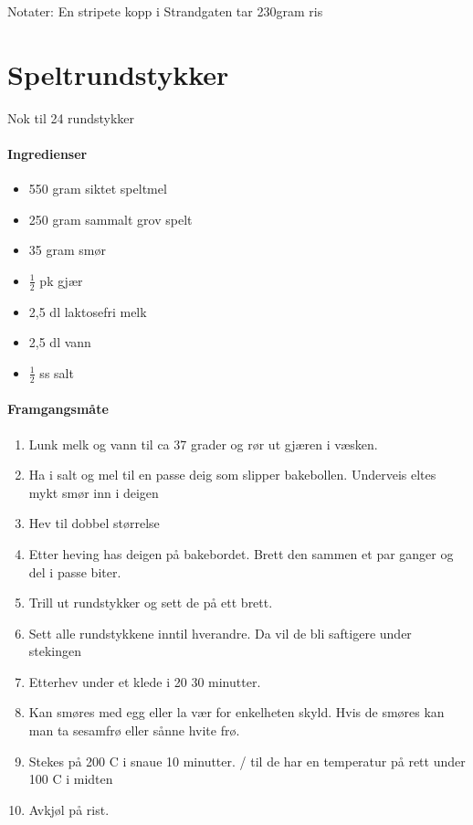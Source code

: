 \documentclass[12pt,a4paper]{book}
\begin{document}
{Notater: En stripete kopp i Strandgaten tar 230gram ris
\clearpage{}
\clearpage{}\section{Speltrundstykker}
Nok til 24 rundstykker

\paragraph{Ingredienser}
\begin{itemize}[noitemsep]
	\item 550 gram siktet speltmel
	\item 250 gram sammalt grov spelt
	\item 35 gram smør
	\item  $\frac{1}{2}$  pk gjær
	\item 2,5 dl laktosefri melk
	\item 2,5 dl vann
	\item  $\frac{1}{2}$  ss salt
\end{itemize}


\paragraph{Framgangsmåte}
\begin{enumerate}[noitemsep]
	\item Lunk melk og vann til ca 37 grader og rør ut gjæren i væsken.
	\item Ha i salt og mel til en passe deig som slipper bakebollen. Underveis eltes mykt smør inn i deigen
	\item Hev til dobbel størrelse
	\item Etter heving has deigen på bakebordet. Brett den sammen et par ganger og del i passe biter.
	\item Trill ut rundstykker og sett de på ett brett.
	\item Sett alle rundstykkene inntil hverandre. Da vil de bli saftigere under stekingen
	\item Etterhev under et klede i 20 30 minutter.
	\item Kan smøres med egg eller la vær for enkelheten skyld. Hvis de smøres kan man ta sesamfrø eller sånne hvite frø.
	\item Stekes på 200 \degree C i snaue 10 minutter. / til de har en temperatur på rett under 100 \degree C i midten
	\item Avkjøl på rist.
\end{enumerate}

}
\end{document}
